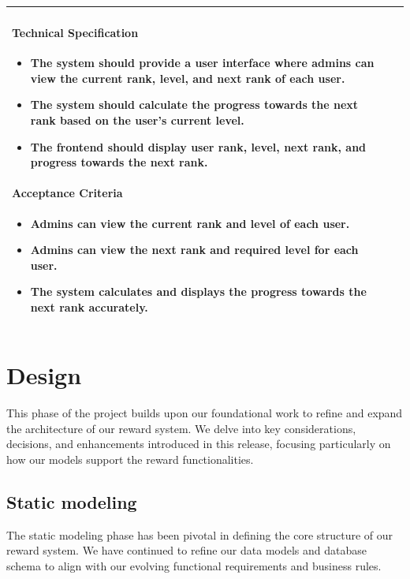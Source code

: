 \begin{longtable}{ | m{} | m{} | }
    \paragraph*{Technical Specification} \mbox{} \newline
    \begin{itemize}
        \item The system should provide a user interface where admins can view the current rank, level, and next rank of each user.
        \item The system should calculate the progress towards the next rank based on the user's current level.
        \item The frontend should display user rank, level, next rank, and progress towards the next rank.
    \end{itemize}
    
    \paragraph*{Acceptance Criteria} \mbox{} \newline
    \begin{itemize}
        \item Admins can view the current rank and level of each user.
        \item Admins can view the next rank and required level for each user.
        \item The system calculates and displays the progress towards the next rank accurately.
    \end{itemize}                                                                                                                                                      \\
    \hline
\end{longtable}

\section{Design}
This phase of the project builds upon our foundational work to refine and expand the architecture of our reward system. We delve into key considerations, decisions, and enhancements introduced in this release, focusing particularly on how our models support the reward functionalities.


\subsection{Static modeling}
The static modeling phase has been pivotal in defining the core structure of our reward system. We have continued to refine our data models and database schema to align with our evolving functional requirements and business rules.



